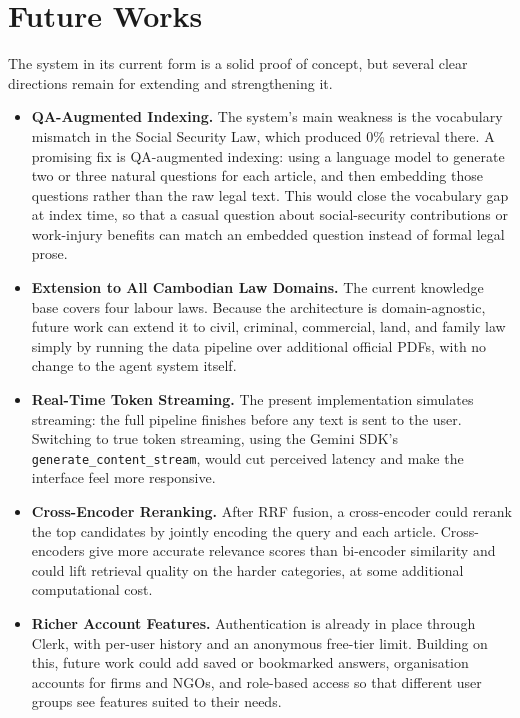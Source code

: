 \section{Future Works}

\hs The system in its current form is a solid proof of concept, but several clear
directions remain for extending and strengthening it.

\begin{itemize}

    \item \textbf{QA-Augmented Indexing.} The system's main weakness is the vocabulary
    mismatch in the Social Security Law, which produced 0\% retrieval there. A promising fix
    is QA-augmented indexing: using a language model to generate two or three natural
    questions for each article, and then embedding those questions rather than the raw legal
    text. This would close the vocabulary gap at index time, so that a casual question about
    social-security contributions or work-injury benefits can match an embedded question
    instead of formal legal prose.

    \item \textbf{Extension to All Cambodian Law Domains.} The current knowledge base covers
    four labour laws. Because the architecture is domain-agnostic, future work can extend it
    to civil, criminal, commercial, land, and family law simply by running the data pipeline
    over additional official PDFs, with no change to the agent system itself.

    \item \textbf{Real-Time Token Streaming.} The present implementation simulates streaming:
    the full pipeline finishes before any text is sent to the user. Switching to true token
    streaming, using the Gemini SDK's \texttt{generate\_content\_stream}, would cut perceived
    latency and make the interface feel more responsive.

    \item \textbf{Cross-Encoder Reranking.} After RRF fusion, a cross-encoder could rerank
    the top candidates by jointly encoding the query and each article. Cross-encoders give
    more accurate relevance scores than bi-encoder similarity and could lift retrieval
    quality on the harder categories, at some additional computational cost.

    \item \textbf{Richer Account Features.} Authentication is already in place through Clerk,
    with per-user history and an anonymous free-tier limit. Building on this, future work
    could add saved or bookmarked answers, organisation accounts for firms and NGOs, and
    role-based access so that different user groups see features suited to their needs.


\end{itemize}
